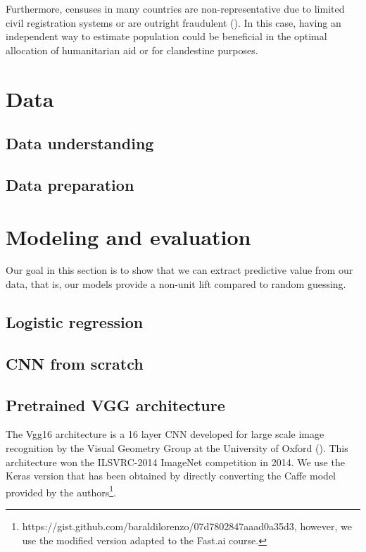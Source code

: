 \documentclass{article}
\begin{document}
Furthermore, censuses in many countries are non-representative due to limited civil registration systems or are outright fraudulent (\cite{BDYPHN06}). In this case, having an independent way to estimate population could be beneficial in the optimal allocation of humanitarian aid or for clandestine purposes.

\section{Data}
\subsection{Data understanding}

\subsection{Data preparation}
\section{Modeling and evaluation}
Our goal in this section is to show that we can extract predictive value from our data, that is, our models provide a non-unit lift compared to random guessing.
\subsection{Logistic regression}
\subsection{CNN from scratch}
\subsection{Pretrained VGG architecture}
The Vgg16 architecture is a 16 layer CNN developed for large scale image recognition by the Visual Geometry Group at the University of Oxford (\cite{SZ14}). This architecture won the ILSVRC-2014 ImageNet competition in 2014. We use the Keras version that has been obtained by directly converting the Caffe model provided by the authors\footnote{https://gist.github.com/baraldilorenzo/07d7802847aaad0a35d3, however, we use the modified version adapted to the Fast.ai course.}.
\end{document}
